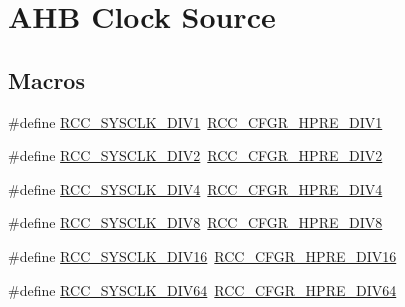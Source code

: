 \hypertarget{group___r_c_c___a_h_b___clock___source}{\section{A\-H\-B Clock Source}
\label{group___r_c_c___a_h_b___clock___source}
}
\subsection*{Macros}
\begin{DoxyCompactItemize}
\item 
\#define \hyperlink{group___r_c_c___a_h_b___clock___source_ga226f5bf675015ea677868132b6b83494}{R\-C\-C\-\_\-\-S\-Y\-S\-C\-L\-K\-\_\-\-D\-I\-V1}~\hyperlink{group___peripheral___registers___bits___definition_ga2b7d7f29b09a49c31404fc0d44645c84}{R\-C\-C\-\_\-\-C\-F\-G\-R\-\_\-\-H\-P\-R\-E\-\_\-\-D\-I\-V1}
\item 
\#define \hyperlink{group___r_c_c___a_h_b___clock___source_gac37c0610458a92e3cb32ec81014625c3}{R\-C\-C\-\_\-\-S\-Y\-S\-C\-L\-K\-\_\-\-D\-I\-V2}~\hyperlink{group___peripheral___registers___bits___definition_gaa9eeb5e38e53e79b08a4ac438497ebea}{R\-C\-C\-\_\-\-C\-F\-G\-R\-\_\-\-H\-P\-R\-E\-\_\-\-D\-I\-V2}
\item 
\#define \hyperlink{group___r_c_c___a_h_b___clock___source_ga6fd3652d6853563cdf388a4386b9d22f}{R\-C\-C\-\_\-\-S\-Y\-S\-C\-L\-K\-\_\-\-D\-I\-V4}~\hyperlink{group___peripheral___registers___bits___definition_gaffe860867ae4b1b6d28473ded1546d91}{R\-C\-C\-\_\-\-C\-F\-G\-R\-\_\-\-H\-P\-R\-E\-\_\-\-D\-I\-V4}
\item 
\#define \hyperlink{group___r_c_c___a_h_b___clock___source_ga7def31373854ba9c72bb76b1d13e3aad}{R\-C\-C\-\_\-\-S\-Y\-S\-C\-L\-K\-\_\-\-D\-I\-V8}~\hyperlink{group___peripheral___registers___bits___definition_gaca71d6b42bdb83b5ff5320578869a058}{R\-C\-C\-\_\-\-C\-F\-G\-R\-\_\-\-H\-P\-R\-E\-\_\-\-D\-I\-V8}
\item 
\#define \hyperlink{group___r_c_c___a_h_b___clock___source_ga895462b261e03eade3d0139cc1327a51}{R\-C\-C\-\_\-\-S\-Y\-S\-C\-L\-K\-\_\-\-D\-I\-V16}~\hyperlink{group___peripheral___registers___bits___definition_ga3806da4f1afc9e5be0fca001c8c57815}{R\-C\-C\-\_\-\-C\-F\-G\-R\-\_\-\-H\-P\-R\-E\-\_\-\-D\-I\-V16}
\item 
\#define \hyperlink{group___r_c_c___a_h_b___clock___source_ga73814b5a7ee000687ec8334637ca5b14}{R\-C\-C\-\_\-\-S\-Y\-S\-C\-L\-K\-\_\-\-D\-I\-V64}~\hyperlink{group___peripheral___registers___bits___definition_ga1caeba8dc2b4c0bb11be600e983e3370}{R\-C\-C\-\_\-\-C\-F\-G\-R\-\_\-\-H\-P\-R\-E\-\_\-\-D\-I\-V64}

\end{DoxyCompactItemize}
